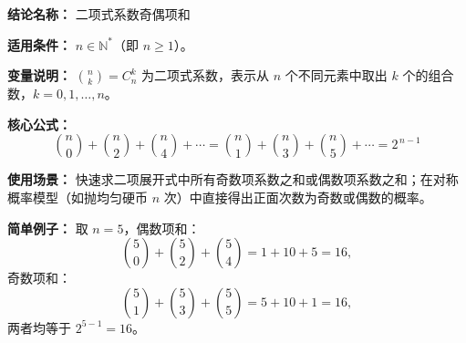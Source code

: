 \textbf{结论名称：} 二项式系数奇偶项和

\textbf{适用条件：} \( n\in\mathbb{N}^* \)（即 \( n\ge 1 \)）。

\textbf{变量说明：} \( \binom{n}{k}=C_n^k \) 为二项式系数，表示从 \( n \) 个不同元素中取出 \( k \) 个的组合数，\( k=0,1,\dots,n \)。

\textbf{核心公式：}
\[
\boxed{\binom{n}{0}+\binom{n}{2}+\binom{n}{4}+\cdots = \binom{n}{1}+\binom{n}{3}+\binom{n}{5}+\cdots = 2^{\,n-1}}
\]

\textbf{使用场景：} 快速求二项展开式中所有奇数项系数之和或偶数项系数之和；在对称概率模型（如抛均匀硬币 \( n \) 次）中直接得出正面次数为奇数或偶数的概率。

\textbf{简单例子：} 取 \( n=5 \)，偶数项和：
\[
\binom{5}{0}+\binom{5}{2}+\binom{5}{4}=1+10+5=16,
\]
奇数项和：
\[
\binom{5}{1}+\binom{5}{3}+\binom{5}{5}=5+10+1=16,
\]
两者均等于 \( 2^{5-1}=16 \)。
